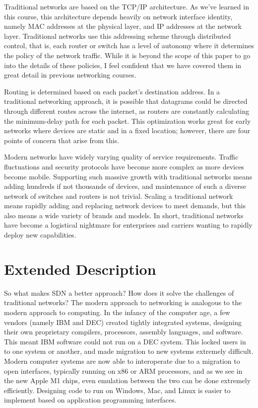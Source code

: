\documentclass[11pt]{article}
\begin{document}
Traditional networks are based on the TCP/IP architecture. As we’ve learned in this course, this architecture depends heavily on network interface identity, namely MAC addresses at the physical layer, and IP addresses at the network layer. Traditional networks use this addressing scheme through distributed control, that is, each router or switch has a level of autonomy where it determines the policy of the network traffic. While it is beyond the scope of this paper to go into the details of these policies, I feel confident that we have covered them in great detail in previous networking courses.

Routing is determined based on each packet’s destination address. In a traditional networking approach, it is possible that datagrams could be directed through different routes across the internet, as routers are constantly calculating the minimum-delay path for each packet. This optimization works great for early networks where devices are static and in a fixed location; however, there are four points of concern that arise from this.

Modern networks have widely varying quality of service requirements. Traffic fluctuations and security protocols have become more complex as more devices become mobile. Supporting such massive growth with traditional networks means adding hundreds if not thousands of devices, and maintenance of such a diverse network of switches and routers is not trivial. Scaling a traditional network means rapidly adding and replacing network devices to meet demands, but this also means a wide variety of brands and models. In short, traditional networks have become a logistical nightmare for enterprises and carriers wanting to rapidly deploy new capabilities.

\section{Extended Description}

So what makes SDN a better approach? How does it solve the challenges of traditional networks? The modern approach to networking is analogous to the modern approach to computing. In the infancy of the computer age, a few vendors (namely IBM and DEC) created tightly integrated systems, designing their own proprietary compilers, processors, assembly languages, and software. This meant IBM software could not run on a DEC system. This locked users in to one system or another, and made migration to new systems extremely difficult. Modern computer systems are now able to interoperate due to a migration to open interfaces, typically running on x86 or ARM processors,  and as we see in the new Apple M1 chips, even emulation between the two can be done extremely efficiently. Designing code to run on Windows, Mac, and Linux is easier to implement based on application programming interfaces.
\end{document}
